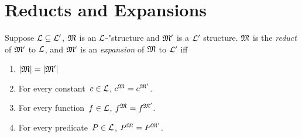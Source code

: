 \documentclass[../../include/open-logic-section]{subfiles}
\begin{document}
\section{Reducts and Expansions}

\begin{defn}
Suppose $\mathcal L \subseteq \mathcal L'$, $\mathfrak M$ is an
$\mathcal L$-"{structure} and $\mathfrak M'$ is a $\mathcal L'$ structure.
$\mathfrak M$ is the \emph{reduct} of $\mathfrak M'$ to $\mathcal L$, and
$\mathfrak M'$ is an \emph{expansion} of $\mathfrak M$ to $\mathcal L'$ iff
\begin{enumerate}
\item $\left| \mathfrak M \right| = \left| \mathfrak M' \right|$
\item For every constant~$c \in \mathcal L$, $c^{\mathfrak M} =
  c^{\mathfrak M'}$.
\item For every function~$f \in \mathcal L$, $f^{\mathfrak M} =
  f^{\mathfrak M'}$.
\item For every predicate~$P \in \mathcal L$, $P^{\mathfrak M} =
  P^{\mathfrak M'}$.
\end{enumerate}
\end{defn}

\end{document}
